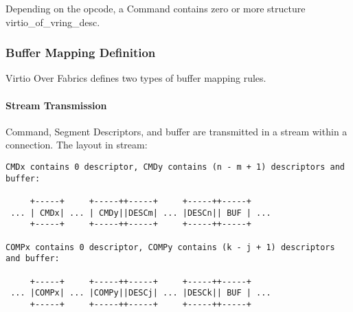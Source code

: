 Depending on the opcode, a Command contains zero or more structure virtio_of_vring_desc.

\subsubsection{Buffer Mapping Definition}\label{sec:Virtio Transport Options / Virtio Over Fabrics / Transmission Protocol / Buffer Mapping Definition}
Virtio Over Fabrics defines two types of buffer mapping rules.

\paragraph{Stream Transmission}\label{sec:Virtio Transport Options / Virtio Over Fabrics / Transmission Protocol / Commands Definition / Stream Transmission}
Command, Segment Descriptors, and buffer are transmitted in a stream within a connection. The layout in stream:

\begin{lstlisting}
CMDx contains 0 descriptor, CMDy contains (n - m + 1) descriptors and buffer:

     +-----+     +-----++-----+     +-----++-----+
 ... | CMDx| ... | CMDy||DESCm| ... |DESCn|| BUF | ...
     +-----+     +-----++-----+     +-----++-----+

COMPx contains 0 descriptor, COMPy contains (k - j + 1) descriptors and buffer:

     +-----+     +-----++-----+     +-----++-----+
 ... |COMPx| ... |COMPy||DESCj| ... |DESCk|| BUF | ...
     +-----+     +-----++-----+     +-----++-----+
\end{lstlisting}

